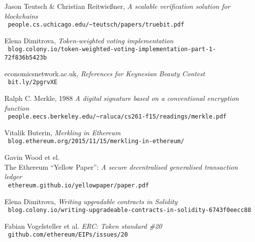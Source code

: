\begin{thebibliography}{9}
  
  
  Jason Teutsch \& Christian Reitwießner,
  \emph{A scalable verification solution for blockchains\\}
  \verb| people.cs.uchicago.edu/~teutsch/papers/truebit.pdf |
  
  Elena Dimitrova,
  \emph{Token-weighted voting implementation\\}
  \verb| blog.colony.io/token-weighted-voting-implementation-part-1-72f836b5423b |
  
  economicsnetwork.ac.uk,
  \emph{References for Keynesian Beauty Contest\\}
  \verb| bit.ly/2pgrvXE |

  Ralph C. Merkle, 1988
  \emph{A digital signature based on a conventional encryption function\\}
  \verb| people.eecs.berkeley.edu/~raluca/cs261-f15/readings/merkle.pdf | 

  Vitalik Buterin,
  \emph{Merkling in Ethereum\\}
  \verb| blog.ethereum.org/2015/11/15/merkling-in-ethereum/ |
  
  Gavin Wood et el.\\
  The Ethereum ``Yellow Paper'':
  \emph{A secure decentralised generalised transaction ledger\\}
  \verb| ethereum.github.io/yellowpaper/paper.pdf |
  
  Elena Dimitrova,
  \emph{Writing upgradable contracts in Solidity\\}
  \verb| blog.colony.io/writing-upgradeable-contracts-in-solidity-6743f0eecc88 |
  
  Fabian Vogelsteller et al.
  \emph{ERC: Token standard \#20\\}
  \verb| github.com/ethereum/EIPs/issues/20 |
  
\end{thebibliography}